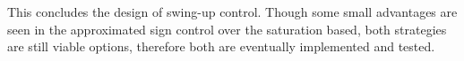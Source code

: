 This concludes the design of swing-up control. Though some small advantages are seen in the approximated sign control over the saturation based, both strategies are still viable options, therefore both are eventually implemented and tested.
%
%
%
%
%
%
